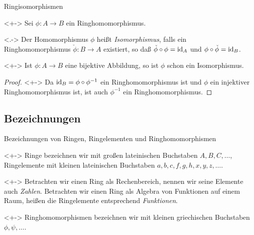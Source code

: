 \begin{frame}{Ringisomorphismen}
    \begin{visibleenv}<+->
        Sei \(\phi\colon A \to B\) ein Ringhomomorphismus.
    \end{visibleenv}    
    \begin{definition}<.->
        Der Homomorphismus \(\phi\) heißt \emph{Isomorphismus}, falls
        ein Ringhomomorphismus \(\check\phi\colon B \to A\) existiert, so daß
        \(\check \phi \circ \phi = \operatorname{id}_A\) und \(\phi \circ \check \phi = \operatorname{id}_B\).
    \end{definition}
    \begin{proposition}<+->
        Ist \(\phi\colon A \to B\) eine bijektive Abbildung, so ist \(\phi\) schon ein 
        Isomorphismus.
    \end{proposition}
    \begin{proof}<+->
        Da \(\operatorname{id}_B = \phi \circ \phi^{-1}\) ein Ringhomomorphismus ist und
        \(\phi\) ein injektiver Ringhomomorphismus ist, ist auch \(\phi^{-1}\)
        ein Ringhomomorphismus.
    \end{proof}
\end{frame}

\subsection{Bezeichnungen}

\begin{frame}{Bezeichnungen von Ringen, Ringelementen und Ringhomomorphismen}
    \begin{convention}<+->
        Ringe bezeichnen wir mit großen lateinischen Buchstaben
        \(A, B, C, \dotsc\), Ringelemente mit kleinen lateinischen Buchstaben
        \(a, b, c, f, g, h, x, y, z, \dotsc\).
    \end{convention}
    \begin{visibleenv}<+->
        Betrachten wir einen Ring als Rechenbereich, nennen wir seine Elemente
        auch \emph{Zahlen}. Betrachten wir einen Ring als Algebra von Funktionen auf
        einem Raum, heißen die Ringelemente entsprechend \emph{Funktionen}.
    \end{visibleenv}
    \begin{convention}<+->
        Ringhomomorphismen bezeichnen wir mit kleinen griechischen
        Buchstaben \(\phi, \psi, \dotsc\).
    \end{convention}
\end{frame}

